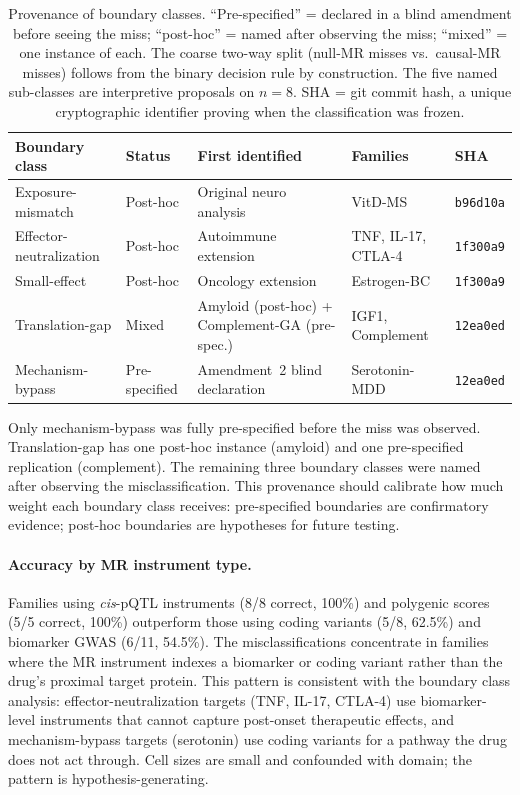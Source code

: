 \documentclass[11pt]{article}
\begin{document}
\begin{table}[t]
\centering
\caption{Provenance of boundary classes. ``Pre-specified'' = declared in a blind amendment before seeing the miss; ``post-hoc'' = named after observing the miss; ``mixed'' = one instance of each. The coarse two-way split (null-MR misses vs.\ causal-MR misses) follows from the binary decision rule by construction. The five named sub-classes are interpretive proposals on $n = 8$. SHA = git commit hash, a unique cryptographic identifier proving when the classification was frozen.}
\label{tab:provenance}
\small
\begin{tabular}{lllll}
\toprule
Boundary class & Status & First identified & Families & SHA \\
\midrule
Exposure-mismatch & Post-hoc & Original neuro analysis & VitD-MS & \texttt{b96d10a} \\
Effector-neutralization & Post-hoc & Autoimmune extension & TNF, IL-17, CTLA-4 & \texttt{1f300a9} \\
Small-effect & Post-hoc & Oncology extension & Estrogen-BC & \texttt{1f300a9} \\
Translation-gap & Mixed & Amyloid (post-hoc) + Complement-GA (pre-spec.) & IGF1, Complement & \texttt{12ea0ed} \\
Mechanism-bypass & Pre-specified & Amendment~2 blind declaration & Serotonin-MDD & \texttt{12ea0ed} \\
\bottomrule
\end{tabular}
\end{table}

Only mechanism-bypass was fully pre-specified before the miss was observed. Translation-gap has one post-hoc instance (amyloid) and one pre-specified replication (complement). The remaining three boundary classes were named after observing the misclassification. This provenance should calibrate how much weight each boundary class receives: pre-specified boundaries are confirmatory evidence; post-hoc boundaries are hypotheses for future testing.

\paragraph{Accuracy by MR instrument type.} Families using \emph{cis}-pQTL instruments (8/8 correct, 100\%) and polygenic scores (5/5 correct, 100\%) outperform those using coding variants (5/8, 62.5\%) and biomarker GWAS (6/11, 54.5\%). The misclassifications concentrate in families where the MR instrument indexes a biomarker or coding variant rather than the drug's proximal target protein. This pattern is consistent with the boundary class analysis: effector-neutralization targets (TNF, IL-17, CTLA-4) use biomarker-level instruments that cannot capture post-onset therapeutic effects, and mechanism-bypass targets (serotonin) use coding variants for a pathway the drug does not act through. Cell sizes are small and confounded with domain; the pattern is hypothesis-generating.
\end{document}
